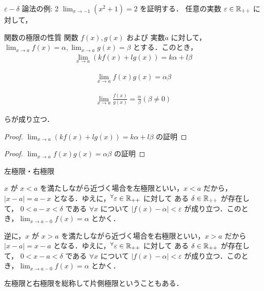 \documentclass[a4paper]{ltjsarticle}
\begin{document}
  \begin{tcb}{$\varepsilon - \delta$ 論法の例: 2}{}
    $\displaystyle \lim_{x \to -1} (x^2 + 1) = 2$ を証明する．
    任意の実数 $\varepsilon \in \mathbb{R}_{++}$ に対して，
  \end{tcb}

  \begin{theorem}{関数の極限の性質}{}
    関数 $f(x), g(x)$ および 実数$a$ に対して，$\displaystyle \lim_{x \to a} f(x) = \alpha, \lim_{x \to a} g(x) = \beta$ とする．このとき，
    \begin{align}
      \displaystyle \lim_{x \to a} (k f(x) + l g(x)) = k\alpha + l\beta
    \end{align}

    \begin{align}
      \displaystyle \lim_{x \to a} f(x)g(x) = \alpha\beta
    \end{align}

    \begin{align}
      \displaystyle \lim_{x \to a} \frac{f(x)}{g(x)} = \frac{\alpha}{\beta} (\beta \neq 0)
    \end{align}

    らが成り立つ．
  \end{theorem}

  \begin{proof}{$\displaystyle \lim_{x \to a} (k f(x) + l g(x)) = k\alpha + l\beta$ の証明}{}

  \end{proof}

  \begin{proof}{$\displaystyle \lim_{x \to a} f(x)g(x) = \alpha\beta$ の証明}{}

  \end{proof}
  
  \begin{tcb}{左極限・右極限}{}
  
  $x$ が $x < a$ を満たしながら近づく場合を左極限といい，$x < a$ だから，$|x - a| = a - x$ となる．ゆえに，$\forall \varepsilon \in \R_{++}$ に対して ある $\delta \in \mathbb{R}_{++}$ が存在して， 
  $0 < a - x < \delta$ である $\forall x$ について $|f(x) - \alpha| < \varepsilon$ が成り立つ．このとき，$\displaystyle \lim_{x \to a-0} f(x) = \alpha$ とかく．

  逆に，$x$ が $x > a$ を満たしながら近づく場合を右極限といい，$x > a$ だから $|x - a| = x - a$ となる．ゆえに，$\forall \varepsilon \in \R_{++}$ に対して ある $\delta \in \mathbb{R}_{++}$ が存在して， 
  $0 < x - a < \delta$ である $\forall x$ について $|f(x) - \alpha| < \varepsilon$ が成り立つ．このとき，$\displaystyle \lim_{x \to a-0} f(x) = \alpha$ とかく．

  左極限と右極限を総称して片側極限ということもある．
  \end{tcb}
\end{document}
